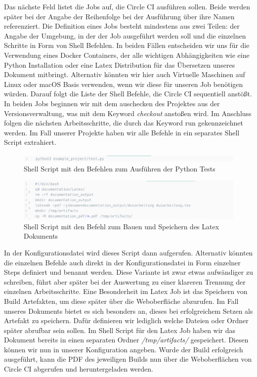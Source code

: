 \documentclass[11pt]{article}
\begin{document}
Das nächste Feld listet die Jobs auf, die Circle CI ausführen sollen. Beide werden später bei der Angabe der Reihenfolge bei der Ausführung über ihre Namen referenziert. Die Definition eines Jobs besteht mindestens aus zwei Teilen: der Angabe der Umgebung, in der der Job ausgeführt werden soll und die einzelnen Schritte in Form von Shell Befehlen. In beiden Fällen entscheiden wir uns für die Verwendung eines Docker Containers, der alle wichtigen Abhängigkeiten wie eine Python Installation oder eine Latex Distribution für das Übersetzen unseres Dokument mitbringt. Alternativ könnten wir hier auch Virtuelle Maschinen auf Linux oder macOS Basis verwenden, wenn wir diese für unseren Job benötigen würden.
Darauf folgt die Liste der Shell Befehle, die Circle CI sequentiell anstößt. In beiden Jobs beginnen wir mit dem auschecken des Projektes aus der Versionsverwaltung, was mit dem Keyword \textit{checkout} anstoßen wird. Im Anschluss folgen die nächsten Arbeitsschritte, die durch das Keyword run gekennzeichnet werden. Im Fall unserer Projekte haben wir alle Befehle in ein separates Shell Script extrahiert.

\begin{figure}[H]
	\centering
  	\includegraphics[width=1\linewidth]{../Images/Config/Python}
  	\caption{Shell Script mit den Befehlen zum Ausführen der Python Tests}
  	\label{fig:python}
\end{figure}

\begin{figure}[H]
	\centering
  	\includegraphics[width=1\linewidth]{../Images/Config/Latex}
  	\caption{Shell Script mit den Befehl zum Bauen und Speichern des Latex Dokuments}
  	\label{fig:latex}
\end{figure}

In der Konfigurationsdatei wird dieses Script dann aufgerufen. Alternativ könnten die einzelnen Befehle auch direkt in der Konfigurationsdatei in Form einzelner Steps definiert und benannt werden. Diese Variante ist zwar etwas aufwändiger zu schreiben, führt aber später bei der Auswertung zu einer klareren Trennung der einzelnen Arbeitsschritte.
Eine Besonderheit im Latex Job ist das Speichern von Build Artefakten, um diese später über die Weboberfläche abzurufen. Im Fall unseres Dokuments bietet es sich besonders an, dieses bei erfolgreichem Setzen als Artefakt zu speichern. Dafür definieren wir lediglich welche Dateien oder Ordner später abrufbar sein sollen. Im Shell Script für den Latex Job haben wir das Dokument bereits in einen separaten Ordner \textit{/tmp/artifacts/} gespeichert. Diesen können wir nun in unserer Konfiguration angeben. Wurde der Build erfolgreich ausgeführt, kann die PDF des jeweiligen Builds nun über die Weboberflächen von Circle CI abgerufen und heruntergeladen werden.
\end{document}
